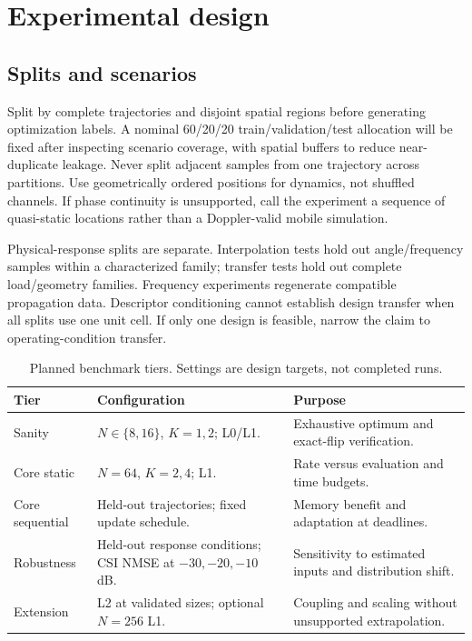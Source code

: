 \documentclass[conference]{IEEEtran}
\begin{document}
\section{Experimental design}
\subsection{Splits and scenarios}
Split by complete trajectories and disjoint spatial regions before generating optimization labels. A nominal 60/20/20 train/validation/test allocation will be fixed after inspecting scenario coverage, with spatial buffers to reduce near-duplicate leakage. Never split adjacent samples from one trajectory across partitions. Use geometrically ordered positions for dynamics, not shuffled channels. If phase continuity is unsupported, call the experiment a sequence of quasi-static locations rather than a Doppler-valid mobile simulation.

Physical-response splits are separate. Interpolation tests hold out angle/frequency samples within a characterized family; transfer tests hold out complete load/geometry families. Frequency experiments regenerate compatible propagation data. Descriptor conditioning cannot establish design transfer when all splits use one unit cell. If only one design is feasible, narrow the claim to operating-condition transfer.

\begin{table}[t]
\caption{Planned benchmark tiers. Settings are design targets, not completed runs.}
\small
\begin{tabularx}{\linewidth}{@{}p{20mm}YY@{}}
\toprule
Tier & Configuration & Purpose\\
\midrule
Sanity & $N\in\{8,16\}$, $K=1,2$; L0/L1. & Exhaustive optimum and exact-flip verification.\\
Core static & $N=64$, $K=2,4$; L1. & Rate versus evaluation and time budgets.\\
Core sequential & Held-out trajectories; fixed update schedule. & Memory benefit and adaptation at deadlines.\\
Robustness & Held-out response conditions; CSI NMSE at $-30,-20,-10$ dB. & Sensitivity to estimated inputs and distribution shift.\\
Extension & L2 at validated sizes; optional $N=256$ L1. & Coupling and scaling without unsupported extrapolation.\\
\bottomrule
\end{tabularx}
\end{table}
\end{document}
